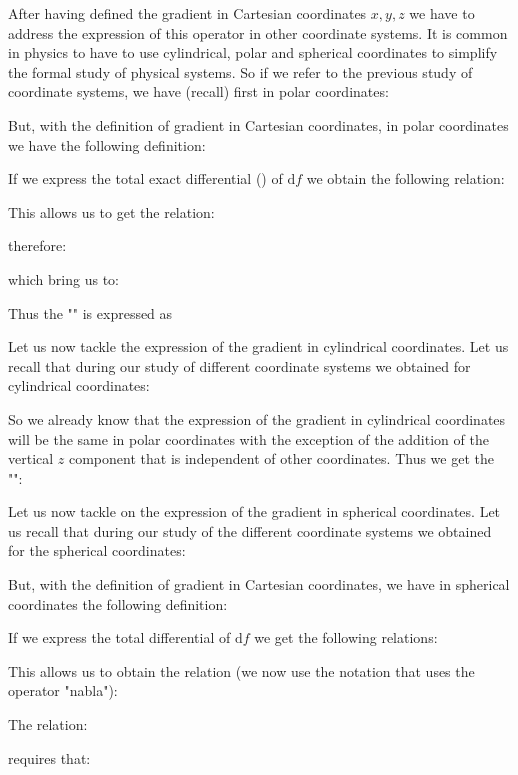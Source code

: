 	After having defined the gradient in Cartesian coordinates $x, y, z$ we have to address the expression of this operator in other coordinate systems. It is common in physics to have to use cylindrical, polar and spherical coordinates to simplify the formal study of physical systems. So if we refer to the previous study of coordinate systems, we have (recall) first in polar coordinates:
	
	But, with the definition of gradient in Cartesian coordinates, in polar coordinates we have the following definition:
	
	If we express the total exact differential () of $\mathrm{d}f$ we obtain the following relation:
	
	This allows us to get the relation:
	
	therefore:
	
	which bring us to:
	
	Thus the "\label{gradient in polar coordinates}" is expressed as
	
	Let us now tackle the expression of the gradient in cylindrical coordinates. Let us recall that  during our study of different coordinate systems we obtained for cylindrical coordinates:
	
	So we already know that the expression of the gradient in cylindrical coordinates will be the same in polar coordinates with the exception of the addition of the vertical $z$ component that is independent of other coordinates. Thus we get the "":
	 
	Let us now tackle on the expression of the gradient in spherical coordinates. Let us recall that during our study of the different coordinate systems we obtained for the spherical coordinates:
	
	But, with the definition of gradient in Cartesian coordinates, we have in spherical coordinates the following definition:
	
	If we express the total differential of $\mathrm{d}f$ we get the following relations:
	
	This allows us to obtain the relation (we now use the notation that uses the operator "nabla"):
	
	The relation:
	
	requires that:
	
